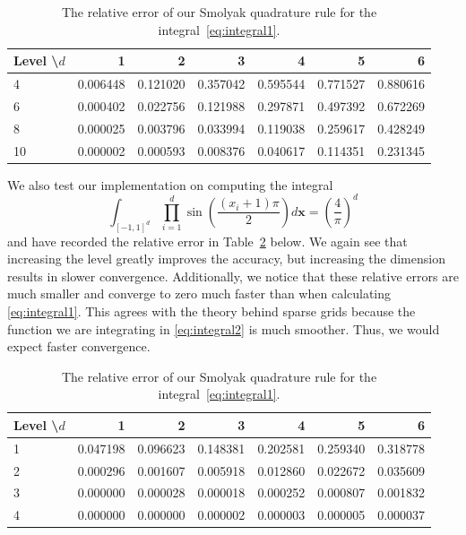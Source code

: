 \documentclass[12pt]{article}
\begin{document}
\begin{enumerate}
\begin{table}[H]
\centering
\begin{tabular}{ | l || r | r | r | r | r | r |}
\hline
Level \textbackslash $d$ & 1 & 2 & 3 & 4 & 5 & 6 \\
\hline
4   & 0.006448 & 0.121020 & 0.357042 & 0.595544 & 0.771527 & 0.880616\\
6   & 0.000402 & 0.022756 & 0.121988 & 0.297871 & 0.497392 & 0.672269\\
8   & 0.000025 & 0.003796 & 0.033994 & 0.119038 & 0.259617 & 0.428249\\
10 & 0.000002 & 0.000593 & 0.008376 & 0.040617 & 0.114351 & 0.231345\\
\hline
\end{tabular}
\caption{The relative error of our Smolyak quadrature rule for the integral~\ref{eq:integral1}.}
\label{table:integral1}
\end{table}

\hspace{0.5cm} We also test our implementation on computing the integral
\begin{equation}
\label{eq:integral2}
\int_{[-1,1]^d} \prod_{i=1}^d \sin\left( \frac{(x_i + 1)\pi}{2}  \right) d{\bm x} = \left(\frac{4}{\pi}\right)^d
\end{equation}
and have recorded the relative error in Table~\ref{table:integral2} below.  We again see that increasing the level greatly improves the accuracy, but increasing the dimension results in slower convergence.  Additionally, we notice that these relative errors are much smaller and converge to zero much faster than when calculating \ref{eq:integral1}.  This agrees with the theory behind sparse grids because the function we are integrating in \ref{eq:integral2} is much smoother.  Thus, we would expect faster convergence.
\begin{table}[H]
\centering
\begin{tabular}{ | l || r | r | r | r | r | r |}
\hline
Level \textbackslash $d$ & 1 & 2 & 3 & 4 & 5 & 6 \\
\hline
1 & 0.047198 & 0.096623 & 0.148381 & 0.202581 & 0.259340 & 0.318778\\
2 & 0.000296 & 0.001607 & 0.005918 & 0.012860 & 0.022672 & 0.035609\\
3 & 0.000000 & 0.000028 & 0.000018 & 0.000252 & 0.000807 & 0.001832\\
4 & 0.000000 & 0.000000 & 0.000002 & 0.000003 & 0.000005 & 0.000037\\
\hline
\end{tabular}
\caption{The relative error of our Smolyak quadrature rule for the integral~\ref{eq:integral1}.}
\label{table:integral2}
\end{table}



\end{enumerate}
\end{document}
